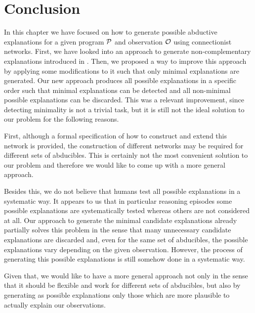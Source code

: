 \section{Conclusion}

In this chapter we have focused on how to generate possible abductive explanations for a given program $\mathcal{P}$ and observation $\mathcal{O}$ using connectionist networks. First, we have looked into an approach to generate non-complementary explanations introduced in \cite{corepaper}. Then, we proposed a way to improve this approach by applying some modifications to it such that only minimal explanations are generated. Our new approach produces all possible explanations in a specific order such that minimal explanations can be detected and all non-minimal possible explanations can be discarded. This was a relevant improvement, since detecting minimality is not a trivial task, but it is still not the ideal solution to our problem for the following reasons.

First, although a formal specification of how to construct and extend this network is provided, the construction of different networks may be required for different sets of abducibles. This is certainly not the most convenient solution to our problem and therefore we would like to come up with a more general approach.

Besides this, we do not believe that humans test all possible explanations in a systematic way. It appears to us that in particular reasoning episodes some possible explanations are systematically tested whereas others are not considered at all. Our approach to generate the minimal candidate explanations already partially solves this problem in the sense that many unnecessary candidate explanations are discarded and, even for the same set of abducibles, the possible explanations vary depending on the given observation. However, the process of generating this possible explanations is still somehow done in a systematic way.

Given that, we would like to have a more general approach not only in the sense that it should be flexible and work for different sets of abducibles, but also by generating as possible explanations only those which are more plausible to actually explain our observations.

\label{sec:cn:conclusion}
